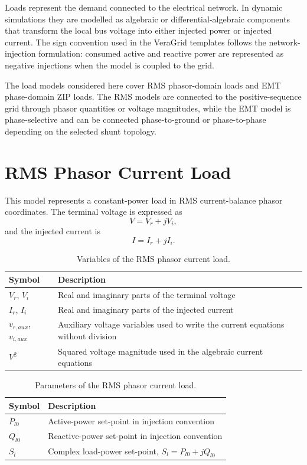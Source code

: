 Loads represent the demand connected to the electrical network. In dynamic simulations they are modelled as algebraic or differential-algebraic components that transform the local bus voltage into either injected power or injected current. The sign convention used in the VeraGrid templates follows the network-injection formulation: consumed active and reactive power are represented as negative injections when the model is coupled to the grid.

The load models considered here cover RMS phasor-domain loads and EMT phase-domain ZIP loads. The RMS models are connected to the positive-sequence grid through phasor quantities or voltage magnitudes, while the EMT model is phase-selective and can be connected phase-to-ground or phase-to-phase depending on the selected shunt topology.

\section{RMS Phasor Current Load}

This model represents a constant-power load in RMS current-balance phasor coordinates. The terminal voltage is expressed as
\begin{equation}
    V = V_r + j V_i,
\end{equation}
and the injected current is
\begin{equation}
    I = I_r + j I_i.
\end{equation}

\begin{table}[H]
    \centering
    \caption{Variables of the RMS phasor current load.}
    \begin{tabular}{ll}
        \toprule
        Symbol & Description \\
        \midrule
        $V_r$, $V_i$ & Real and imaginary parts of the terminal voltage \\
        $I_r$, $I_i$ & Real and imaginary parts of the injected current \\
        $v_{r,aux}$, $v_{i,aux}$ & Auxiliary voltage variables used to write the current equations without division \\
        $V^2$ & Squared voltage magnitude used in the algebraic current equations \\
        \bottomrule
    \end{tabular}
\end{table}

\begin{table}[H]
    \centering
    \caption{Parameters of the RMS phasor current load.}
    \begin{tabular}{ll}
        \toprule
        Symbol & Description \\
        \midrule
        $P_{l0}$ & Active-power set-point in injection convention \\
        $Q_{l0}$ & Reactive-power set-point in injection convention \\
        $S_l$ & Complex load-power set-point, $S_l=P_{l0}+jQ_{l0}$ \\
        \bottomrule
    \end{tabular}
\end{table}

